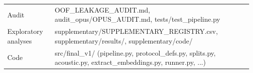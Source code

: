 \documentclass[11pt,a4paper]{article}
\begin{document}
\begin{center}
\begin{longtable}{>{\raggedright\arraybackslash}p{3.57cm}>{\raggedright\arraybackslash}p{12.09cm}}
\hspace{0pt}Audit & \hspace{0pt}OOF\_\allowbreak{}LEAKAGE\_\allowbreak{}AUDIT.md, audit\_\allowbreak{}opus/\allowbreak{}OPUS\_\allowbreak{}AUDIT.md, tests/\allowbreak{}test\_\allowbreak{}pipeline.py\\
\hspace{0pt}Exploratory analyses & \hspace{0pt}supplementary/\allowbreak{}SUPPLEMENTARY\_\allowbreak{}REGISTRY.csv, supplementary/\allowbreak{}results/\allowbreak{}, supplementary/\allowbreak{}code/\allowbreak{}\\
\hspace{0pt}Code & \hspace{0pt}src/\allowbreak{}final\_\allowbreak{}v1/\allowbreak{} (pipeline.py, protocol\_\allowbreak{}defs.py, splits.py, acoustic.py, extract\_\allowbreak{}embeddings.py, runner.py, ...)\\
\end{longtable}\end{center}
\end{document}

